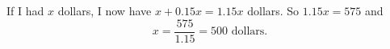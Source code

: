 If I had $x$ dollars, I now have $x+0.15x=1.15x$ dollars. So $1.15x=575$ and
\[
x=\dfrac{575}{1.15}=\boxed{500}\text{ dollars}.
\]
